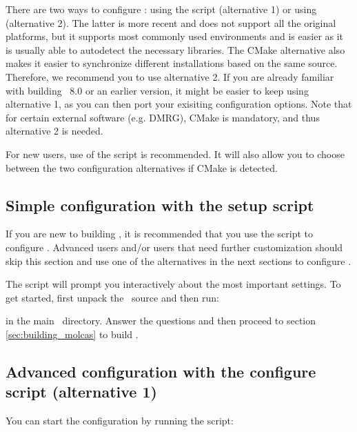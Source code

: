 There are two ways to configure \molcas: using the  script (alternative 1)
or using  (alternative 2). The latter is more recent and does not support all the
original platforms, but it supports most commonly used environments
and is easier as it is usually able to autodetect the necessary libraries.
The CMake alternative also makes it easier to synchronize different installations
based on the same source. Therefore, we recommend you to use alternative 2.
If you are already familiar with building \molcas\ 8.0 or an earlier version,
it might be easier to keep using alternative 1, as you can then port your exisiting
configuration options.
Note that for certain external software (e.g. DMRG), CMake is mandatory,
and thus alternative 2 is needed.

For new users, use of the  script is recommended. It will also allow
you to choose between the two configuration alternatives if CMake is detected.

\subsection{Simple configuration with the setup script}

If you are new to building \molcas, it is recommended that you use the
 script to configure \molcas. Advanced users and/or users that need
further customization should skip this section and use one of the alternatives
in the next sections to configure \molcas.

The  script will prompt you interactively about the most important settings.
To get started, first unpack the \molcas\ source and then run:
\begin{description}
\item {}
\end{description}
in the main \molcas\ directory. Answer the questions and then proceed to
section \ref{sec:building_molcas} to build \molcas.

\subsection{Advanced configuration with the configure script (alternative 1)}

You can start the configuration by running the  script:
\begin{description}
\item {}
\end{description}

